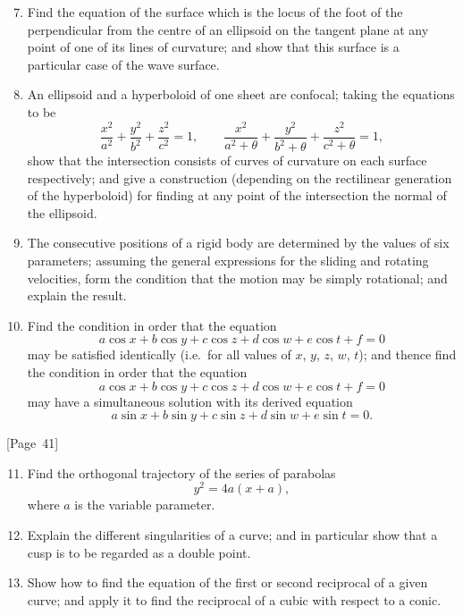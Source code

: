 \documentclass[11pt,a4paper]{book}
\begin{document}
\begin{enumerate}
\setcounter{enumi}{6}
\item Find the equation of the surface which is the locus of the
foot of the perpendicular from the centre of an ellipsoid on the tangent
plane at any point of one of its lines of curvature; and show that this
surface is a particular case of the wave surface.

\item An ellipsoid and a hyperboloid of one sheet are confocal; taking
the equations to be
\[
\frac{x^2}{a^2} + \frac{y^2}{b^2} + \frac{z^2}{c^2} = 1, \qquad
\frac{x^2}{a^2+\theta} + \frac{y^2}{b^2+\theta} + \frac{z^2}{c^2+\theta} = 1,
\]
show that the intersection consists of curves of curvature on each
surface respectively; and give a construction (depending on the
rectilinear generation of the hyperboloid) for finding at any point of
the intersection the normal of the ellipsoid.

\item The consecutive positions of a rigid body are determined by the
values of six parameters; assuming the general expressions for the
sliding and rotating velocities, form the condition that the motion may
be simply rotational; and explain the result.

\item Find the condition in order that the equation
\[
a\cos x + b\cos y + c\cos z + d\cos w + e\cos t + f = 0
\]
may be satisfied identically (i.e.\ for all values of $x$, $y$, $z$, $w$, $t$);
and thence find the condition in order that the equation
\[
a\cos x + b\cos y + c\cos z + d\cos w + e\cos t + f = 0
\]
may have a simultaneous solution with its derived equation
\[
a\sin x + b\sin y + c\sin z + d\sin w + e\sin t = 0.
\]
\end{enumerate}

\begin{center}
[Page~41]
\end{center}

\begin{enumerate}
\setcounter{enumi}{10}
\item Find the orthogonal trajectory of the series of parabolas
\[
y^2 = 4a(x+a),
\]
where $a$ is the variable parameter.

\item Explain the different singularities of a curve; and in particular
show that a cusp is to be regarded as a double point.

\item Show how to find the equation of the first or second reciprocal
of a given curve; and apply it to find the reciprocal of a cubic with
respect to a conic.
\end{enumerate}
\end{document}
